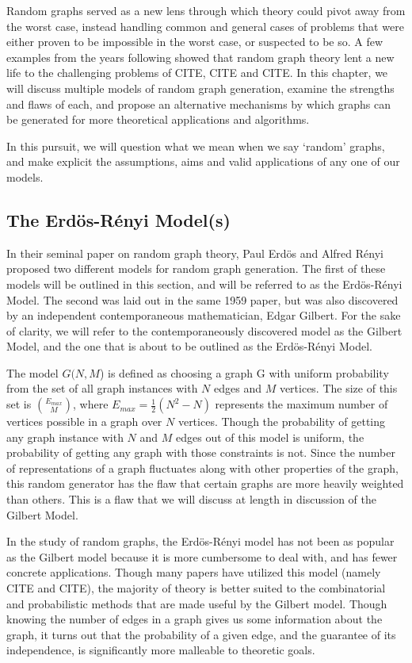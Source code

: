 \documentclass[11pt,a4paper]{report}
\begin{document}
Random graphs served as a new lens through which theory could pivot away from the worst case, instead handling common and general cases of problems that were either proven to be impossible in the worst case, or suspected to be so. 
A few examples from the years following showed that random graph theory lent a new life to the challenging problems of CITE, CITE and CITE.
In this chapter, we will discuss multiple models of random graph generation, examine the strengths and flaws of each, and propose an alternative mechanisms by which graphs can be generated for more theoretical applications and algorithms.

In this pursuit, we will question what we mean when we say `random' graphs, and make explicit the assumptions, aims and valid applications of any one of our models. 

\subsection{The Erd\"os-R\'enyi Model(s)}

In their seminal paper on random graph theory, Paul Erd\"os and Alfred R\'enyi proposed two different models for random graph generation.
The first of these models will be outlined in this section, and will be referred to as the Erd\"os-R\'enyi Model.
The second was laid out in the same 1959 paper, but was also discovered by an independent contemporaneous mathematician, Edgar Gilbert.
For the sake of clarity, we will refer to the contemporaneously discovered model as the Gilbert Model, and the one that is about to be outlined as the Erd\"os-R\'enyi Model.

The model $G(N, M$) is defined as choosing a graph G with uniform probability from the set of all graph instances with $N$ edges and $M$ vertices.
The size of this set is $\binom{E_{max}}{M}$, where $E_{max} = \frac{1}{2}(N^2 - N)$ represents the maximum number of vertices possible in a graph over $N$ vertices.
Though the probability of getting any graph instance with $N$ and $M$ edges out of this model is uniform, the probability of getting any graph with those constraints is not.
Since the number of representations of a graph fluctuates along with other properties of the graph, this random generator has the flaw that certain graphs are more heavily weighted than others.
This is a flaw that we will discuss at length in discussion of the Gilbert Model.

In the study of random graphs, the Erd\"os-R\'enyi model has not been as popular as the Gilbert model because it is more cumbersome to deal with, and has fewer concrete applications.
Though many papers have utilized this model (namely CITE and CITE), the majority of theory is better suited to the combinatorial and probabilistic methods that are made useful by the Gilbert model.
Though knowing the number of edges in a graph gives us some information about the graph, it turns out that the probability of a given edge, and the guarantee of its independence, is significantly more malleable to theoretic goals.
\end{document}
